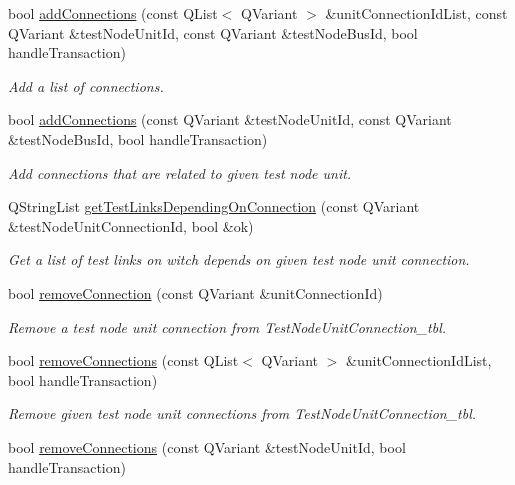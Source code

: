 \begin{DoxyCompactItemize}
bool \hyperlink{classmdt_tt_test_node_unit_a94fb2e68a3bdc156910ef103cbbe28f9}{add\-Connections} (const Q\-List$<$ Q\-Variant $>$ \&unit\-Connection\-Id\-List, const Q\-Variant \&test\-Node\-Unit\-Id, const Q\-Variant \&test\-Node\-Bus\-Id, bool handle\-Transaction)
\begin{DoxyCompactList}\small\item\em Add a list of connections. \end{DoxyCompactList}\item 
bool \hyperlink{classmdt_tt_test_node_unit_a69d8af3b7317ec6dee07d2ba860e2d3c}{add\-Connections} (const Q\-Variant \&test\-Node\-Unit\-Id, const Q\-Variant \&test\-Node\-Bus\-Id, bool handle\-Transaction)
\begin{DoxyCompactList}\small\item\em Add connections that are related to given test node unit. \end{DoxyCompactList}\item 
Q\-String\-List \hyperlink{classmdt_tt_test_node_unit_a9da3578291033f5f9d77f186fe2fb325}{get\-Test\-Links\-Depending\-On\-Connection} (const Q\-Variant \&test\-Node\-Unit\-Connection\-Id, bool \&ok)
\begin{DoxyCompactList}\small\item\em Get a list of test links on witch depends on given test node unit connection. \end{DoxyCompactList}\item 
bool \hyperlink{classmdt_tt_test_node_unit_a80ecfabd0a6851c7542dc613d69cac26}{remove\-Connection} (const Q\-Variant \&unit\-Connection\-Id)
\begin{DoxyCompactList}\small\item\em Remove a test node unit connection from Test\-Node\-Unit\-Connection\-\_\-tbl. \end{DoxyCompactList}\item 
bool \hyperlink{classmdt_tt_test_node_unit_a31bde37340b294c0ee5b2f85a710f29e}{remove\-Connections} (const Q\-List$<$ Q\-Variant $>$ \&unit\-Connection\-Id\-List, bool handle\-Transaction)
\begin{DoxyCompactList}\small\item\em Remove given test node unit connections from Test\-Node\-Unit\-Connection\-\_\-tbl. \end{DoxyCompactList}\item 
bool \hyperlink{classmdt_tt_test_node_unit_ac9acc3c586a206192a7a5b9effa0d278}{remove\-Connections} (const Q\-Variant \&test\-Node\-Unit\-Id, bool handle\-Transaction)

\end{DoxyCompactItemize}
